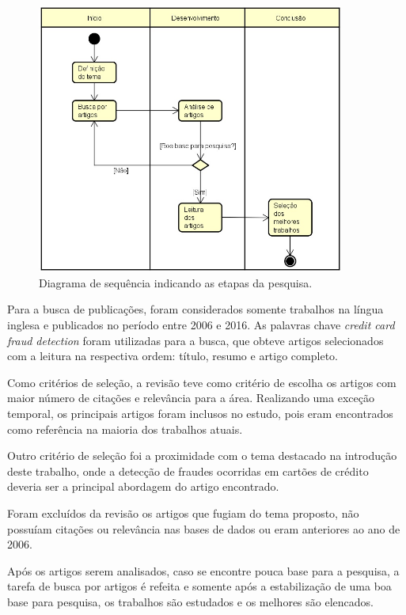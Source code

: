 \documentclass[smallextended]{svjour3}       %
\begin{document}
\begin{figure}[!ht]
	\centering
	\includegraphics[width=0.9\textwidth]{imagens/diagrama.jpg}
	\caption{Diagrama de sequência indicando as etapas da pesquisa.}
	\label{fig:diagrama}
\end{figure}

Para a busca de publicações, foram considerados somente trabalhos na língua inglesa e publicados no período entre 2006 e 2016. As palavras chave \emph{credit card fraud detection} foram utilizadas para a busca, que obteve artigos selecionados com a leitura na respectiva ordem: título, resumo e artigo completo. 

Como critérios de seleção, a revisão teve como critério de escolha os artigos com maior número de citações e relevância para a área. Realizando uma exceção temporal, os principais artigos foram inclusos no estudo, pois eram encontrados como referência na maioria dos trabalhos atuais.

Outro critério de seleção foi a proximidade com o tema destacado na introdução deste trabalho, onde a detecção de fraudes ocorridas em cartões de crédito deveria ser a principal abordagem do artigo encontrado.

Foram excluídos da revisão os artigos que fugiam do tema proposto, não possuíam citações ou relevância nas bases de dados ou eram anteriores ao ano de 2006.

Após os artigos serem analisados, caso se encontre pouca base para a pesquisa, a tarefa de busca por artigos é refeita e somente após a estabilização de uma boa base para pesquisa, os trabalhos são estudados e os melhores são elencados.
\end{document}
